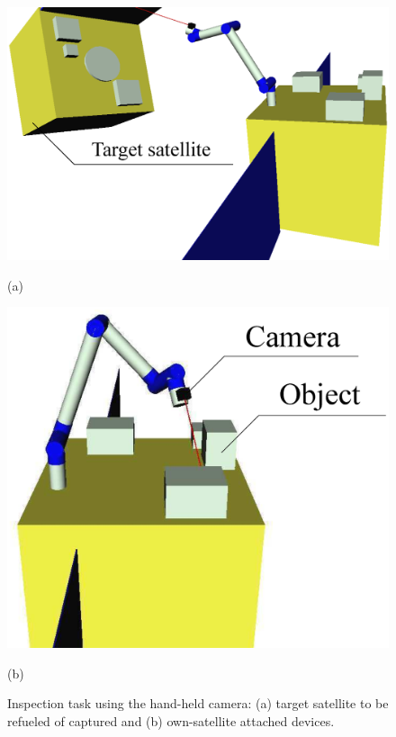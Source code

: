 %
\begin{figure}[t]
  \centering
  \begin{minipage}[h]{0.495\linewidth}
    \centering
    \includegraphics[width=1.0\linewidth]{fig/chapter4/inspection/observation.eps}
    \footnotesize\par{(a)}
  \end{minipage}
  \begin{minipage}[h]{0.495\linewidth}
    \centering
    \includegraphics[width=1.0\linewidth]{fig/chapter4/inspection/inspection.eps}
    \footnotesize\par{(b)}
  \end{minipage}
  \caption{Inspection task using the hand-held camera: 
    (a) target satellite to be refueled of captured and (b) own-satellite attached devices.}
  \label{fig:ins}
\end{figure}
